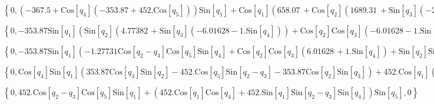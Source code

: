 \documentclass{article}
\begin{document}
\begin{doublespace}
\noindent\(\left\{0,\left(-367.5+\text{Cos}\left[q_4\right] \left(-353.87+452. \text{Cos}\left[q_5\right]\right)\right) \text{Sin}\left[q_1\right]+\text{Cos}\left[q_1\right]
\left(658.07\, +\text{Cos}\left[q_2\right] \left(1689.31\, +\text{Sin}\left[q_3\right] \left(-2128.98-353.87 \text{Sin}\left[q_4\right]\right)\right)-452.
\text{Cos}\left[q_5\right] \text{Sin}\left[q_2-q_3\right] \text{Sin}\left[q_4\right]+\text{Cos}\left[q_3\right] \text{Sin}\left[q_2\right] \left(2128.98\,
+353.87 \text{Sin}\left[q_4\right]\right)+452. \text{Cos}\left[q_2-q_3\right] \text{Sin}\left[q_5\right]\right),0\right\}\)
\end{doublespace}

\begin{doublespace}
\noindent\(\left\{0,-353.87 \text{Sin}\left[q_1\right] \left(\text{Sin}\left[q_2\right] \left(4.77382\, +\text{Sin}\left[q_3\right] \left(-6.01628-1.
\text{Sin}\left[q_4\right]\right)\right)+\text{Cos}\left[q_2\right] \text{Cos}\left[q_3\right] \left(-6.01628-1. \text{Sin}\left[q_4\right]\right)+1.27731
\text{Cos}\left[q_2-q_3\right] \text{Cos}\left[q_5\right] \text{Sin}\left[q_4\right]+1.27731 \text{Sin}\left[q_2-q_3\right] \text{Sin}\left[q_5\right]\right),0\right\}\)
\end{doublespace}

\begin{doublespace}
\noindent\(\left\{0,-353.87 \text{Sin}\left[q_1\right] \left(-1.27731 \text{Cos}\left[q_2-q_3\right] \text{Cos}\left[q_5\right] \text{Sin}\left[q_4\right]+\text{Cos}\left[q_2\right]
\text{Cos}\left[q_3\right] \left(6.01628\, +1. \text{Sin}\left[q_4\right]\right)+\text{Sin}\left[q_2\right] \text{Sin}\left[q_3\right] \left(6.01628\,
+1. \text{Sin}\left[q_4\right]\right)-1.27731 \text{Sin}\left[q_2-q_3\right] \text{Sin}\left[q_5\right]\right),0\right\}\)
\end{doublespace}

\begin{doublespace}
\noindent\(\left\{0,\text{Cos}\left[q_4\right] \text{Sin}\left[q_1\right] \left(353.87 \text{Cos}\left[q_3\right] \text{Sin}\left[q_2\right]-452.
\text{Cos}\left[q_5\right] \text{Sin}\left[q_2-q_3\right]-353.87 \text{Cos}\left[q_2\right] \text{Sin}\left[q_3\right]\right)+452. \text{Cos}\left[q_1\right]
\left(-0.782898+\text{Cos}\left[q_5\right]\right) \text{Sin}\left[q_4\right],0\right\}\)
\end{doublespace}

\begin{doublespace}
\noindent\(\left\{0,452. \text{Cos}\left[q_2-q_3\right] \text{Cos}\left[q_5\right] \text{Sin}\left[q_1\right]+\left(452. \text{Cos}\left[q_1\right]
\text{Cos}\left[q_4\right]+452. \text{Sin}\left[q_1\right] \text{Sin}\left[q_2-q_3\right] \text{Sin}\left[q_4\right]\right) \text{Sin}\left[q_5\right],0\right\}\)
\end{doublespace}
\end{document}
